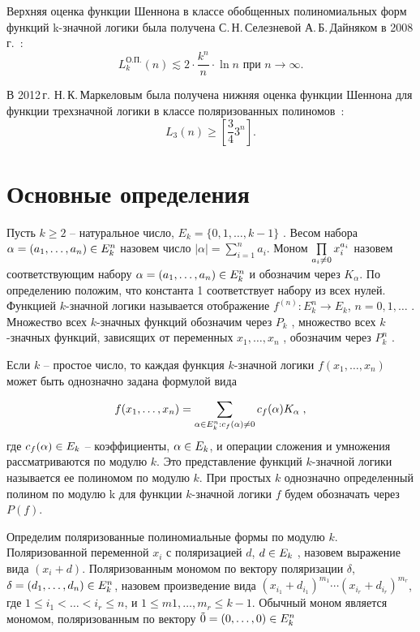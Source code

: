\documentclass[a4paper, 12pt]{article}
\def\neq{\not=\nobreak\discretionary{}{\usefont{OMS}{cmsy}{m}{n}\char54\usefont{OT1}{cmr}{m}{n}\char61}{}}
\def\in{\mathchar"3232\nobreak\discretionary{}{\usefont{OMS}{cmsy}{m}{n}\char50}{}}
\begin{document}
Верхняя оценка функции Шеннона в классе обобщенных полиномиальных форм функций k\nobreakdash-значной логики была получена
С.\,Н.\,Селезневой А.\,Б.\,Дайняком в 2008\,г.~\cite{sd08}:
$$
L^{\text{О.П.}}_k(n) \lesssim 2\cdot\frac{k ^ n}{n}\cdot \ln n \text{ при } n \rightarrow \infty.
$$

В 2012\,г. Н.\,К.\,Маркеловым была получена нижняя оценка функции Шеннона для функции трехзначной логики в классе
поляризованных полиномов~\cite{mn12}:
$$
L_3(n) \geqslant \left[\frac{3}{4}3^n\right].
$$

\section{Основные определения}

Пусть $k \geqslant 2$ -- натуральное число,
$E_k = \{0, 1, \dots, k - 1\}$
. Весом набора
$\alpha = (a_1, \dots, a_n ) \in E_k^n$ назовем число $|\alpha| = \sum\limits_{i=1}^n a_i$.
Моном $\prod\limits_{a_i\neq0}x_i^{a_i}$ назовем соответствующим набору $\alpha = (a_1, \dots, a_n ) \in E_k^n$ и обозначим
через $K_{\alpha}$. По определению положим, что константа 1 соответствует набору из всех нулей.
Функцией $k$\nobreakdash-значной логики называется отображение $f^{(n)} : E_k^n \rightarrow E_k$,
$n = 0, 1, \dots$ . Множество всех $k$\nobreakdash-значных функций обозначим через $P_k$ , множество
всех $k$\nobreakdash-значных функций, зависящих от переменных $x_1, \dots, x_n$ , обозначим через $P_k^n$ .

Если $k$ -- простое число, то каждая функция $k$\nobreakdash-значной логики $f(x_1 , \dots , x_n)$
может быть однозначно задана формулой вида

$$ f(x_1, \dots, x_n) = \sum_{\alpha \in E_k^n:c_f(\alpha) \neq 0}c_f(\alpha)K_\alpha \; ,$$
где $c_f(\alpha) \in E_k$ -- коэффициенты, $\alpha \in E_k$, и операции сложения и умножения
рассматриваются по модулю $k$. Это представление функций $k$\nobreakdash-значной
логики называется ее полиномом по модулю $k$. При простых $k$ однозначно
определенный полином по модулю k для функции $k$\nobreakdash-значной логики $f$ будем
обозначать через $P(f)$.

Определим поляризованные полиномиальные формы по модулю $k$. Поляризованной переменной $x_i$ с поляризацией $d$,
$d \in E_k$ , назовем выражение вида $(x_i + d)$. Поляризованным мономом по вектору поляризации $\delta$,
$\delta = (d_1, \dots, d_n) \in E_k^n$, назовем произведение вида $(x_{i_1} + d_{i_1} )^{m_1}\cdots(x_{i_r} + d_{i_r})^{m_r}$,
где $1 \leqslant i_1 < \ldots < i_r \leqslant n$, и $1 \leqslant m 1 , \dots , m_r \leqslant k - 1$. Обычный моном является
мономом, поляризованным по вектору $\tilde{0} = (0, \dots, 0) \in E_k^n $
\end{document}
